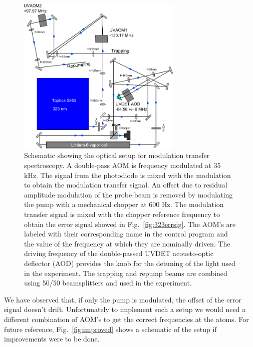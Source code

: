 \documentclass[oneside,12pt]{memoir}
\begin{document}
\begin{figure} \centering
\includegraphics[width=0.7\textwidth]{../figures/323setup/aomsetup/optical_setup.pdf}
\caption[Schematic of modulation transfer spectroscopy]{\small Schematic
showing the optical setup for modulation transfer spectroscopy.   A double-pass
AOM is frequency modulated at 35 kHz.  The signal from the photodiode is mixed
with the modulation to obtain the modulation transfer signal.  An offset due to
residual amplitude modulation of the probe beam is removed by modulating the
pump with a mechanical chopper at 600 Hz.  The modulation transfer signal is
mixed with the chopper reference frequency to obtain the error signal showed in
Fig.~\ref{fig:323errsig}. The AOM's are labeled with their corresponding name
in the control program and the value of the frequency at which they are
nominally driven.   The driving frequency of the double-passed UVDET
acousto-optic deflector (AOD) provides the knob for the detuning of the light
used in the experiment.  The trapping and repump beams are combined using 50/50
beamsplitters and used in the experiment.} \label{fig:modtransfer} \end{figure}

We have observed that, if only the pump is modulated, the offset of the error
signal doesn't drift.  Unfortunately to implement such a setup we would need a
different combination of AOM's  to get the correct frequencies at the atoms.
For future reference, Fig.~\ref{fig:improved} shows a schematic of the setup if
improvements were to be done.
 
\end{document}
